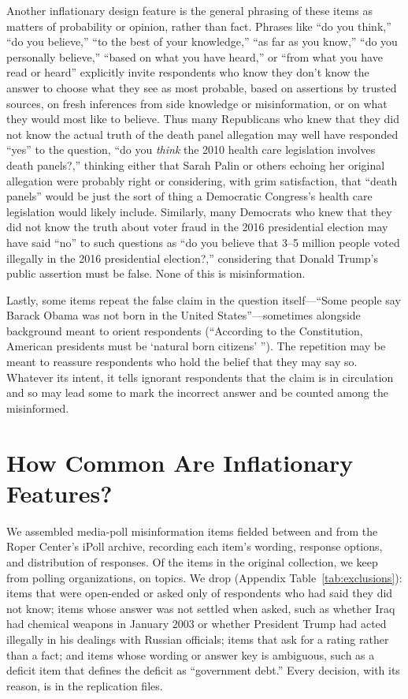 \documentclass[11pt]{article}
\begin{document}
Another inflationary design feature is the general phrasing of these items as matters of probability or opinion, rather than fact. Phrases like ``do you think,'' ``do you believe,'' ``to the best of your knowledge,'' ``as far as you know,'' ``do you personally believe,'' ``based on what you have heard,'' or ``from what you have read or heard'' explicitly invite respondents who know they don't know the answer to choose what they see as most probable, based on assertions by trusted sources, on fresh inferences from side knowledge or misinformation, or on what they would most like to believe. Thus many Republicans who knew that they did not know the actual truth of the death panel allegation may well have responded ``yes'' to the question, ``do you \emph{think} the 2010 health care legislation involves death panels?,'' thinking either that Sarah Palin or others echoing her original allegation were probably right or considering, with grim satisfaction, that ``death panels'' would be just the sort of thing a Democratic Congress's health care legislation would likely include. Similarly, many Democrats who knew that they did not know the truth about voter fraud in the 2016 presidential election may have said ``no'' to such questions as ``do you believe that 3--5 million people voted illegally in the 2016 presidential election?,'' considering that Donald Trump's public assertion must be false. None of this is misinformation.

Lastly, some items repeat the false claim in the question itself---``Some people say Barack Obama was not born in the United States''---sometimes alongside background meant to orient respondents (``According to the Constitution, American presidents must be `natural born citizens' ''). The repetition may be meant to reassure respondents who hold the belief that they may say so. Whatever its intent, it tells ignorant respondents that the claim is in circulation and so may lead some to mark the incorrect answer and be counted among the misinformed.

\section{How Common Are Inflationary Features?}

We assembled media-poll misinformation items fielded between \firstYear{} and \lastYear{} from the Roper Center's iPoll archive, recording each item's wording, response options, and distribution of responses. Of the \nCorpus{} items in the original collection, we keep \nKept{} from \nFirms{} polling organizations, on \nTopics{} topics. We drop \nDropped{} (Appendix Table~\ref{tab:exclusions}): items that were open-ended or asked only of respondents who had said they did not know; items whose answer was not settled when asked, such as whether Iraq had chemical weapons in January 2003 or whether President Trump had acted illegally in his dealings with Russian officials; items that ask for a rating rather than a fact; and items whose wording or answer key is ambiguous, such as a deficit item that defines the deficit as ``government debt.'' Every decision, with its reason, is in the replication files.
\end{document}
